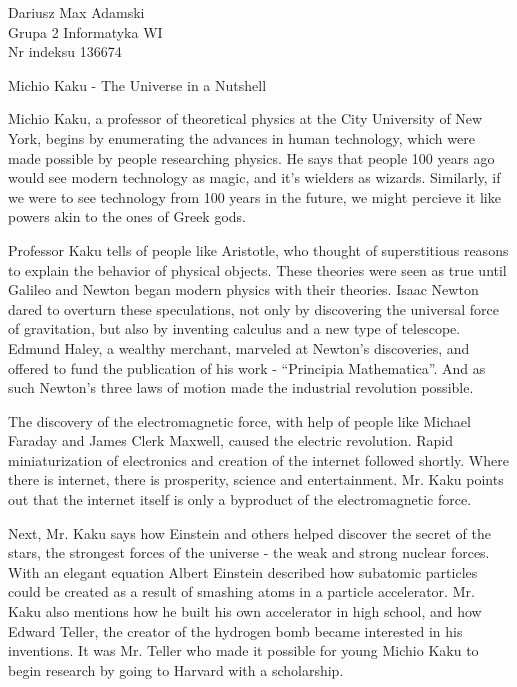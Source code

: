 \documentclass[12pt]{article}
\begin{document}
\begin{flushleft} 
	Dariusz Max Adamski \\
	Grupa 2 Informatyka WI\\
	Nr indeksu 136674
\end{flushleft}

\begin{center} 
	\vspace{0.8cm} \Large
	Michio Kaku - The Universe in a Nutshell
	\vspace{0.5cm}
\end{center}

Michio Kaku, a professor of theoretical physics at the City University of New York, begins by enumerating the advances in human technology, which were made possible by people researching physics. He says that people 100 years ago would see modern technology as magic, and it's wielders as wizards. Similarly, if we were to see technology from 100 years in the future, we might percieve it like powers akin to the ones of Greek gods.

Professor Kaku tells of people like Aristotle, who thought of superstitious reasons to explain the behavior of physical objects. These theories were seen as true until Galileo and Newton began modern physics with their theories. Isaac Newton dared to overturn these speculations, not only by discovering the universal force of gravitation, but also by inventing calculus and a new type of telescope. Edmund Haley, a wealthy merchant, marveled at Newton's discoveries, and offered to fund the publication of his work - “Principia Mathematica”. And as such Newton's three laws of motion made the industrial revolution possible.

The discovery of the electromagnetic force, with help of people like Michael Faraday and James Clerk Maxwell, caused the electric revolution. Rapid miniaturization of electronics and creation of the internet followed shortly. Where there is internet, there is prosperity, science and entertainment. Mr. Kaku points out that the internet itself is only a byproduct of the electromagnetic force.

Next, Mr. Kaku says how Einstein and others helped discover the secret of the stars, the strongest forces of the universe - the weak and strong nuclear forces. With an elegant equation Albert Einstein described how subatomic particles could be created as a result of smashing atoms in a particle accelerator. Mr. Kaku also mentions how he built his own accelerator in high school, and how Edward Teller, the creator of the hydrogen bomb became interested in his inventions. It was Mr. Teller who made it possible for young Michio Kaku to begin research by going to Harvard with a scholarship.
\end{document}
